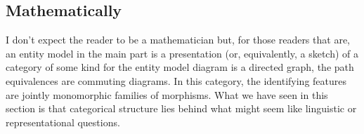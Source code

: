 \subsection{Mathematically}
\mynote
I don't expect the reader to be a mathematician but, for those readers that are, 
an entity model in the main part is a presentation 
(or, equivalently, a sketch) of a category of some kind for the entity model diagram is a directed graph, 
the path equivalences are commuting diagrams. 
In this category, the identifying features are jointly monomorphic families of morphisms.
What we have seen in this section is that categorical structure lies behind what might seem like linguistic or representational questions.


